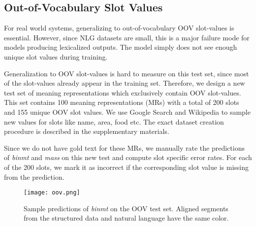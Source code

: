 \documentclass[11pt,a4paper]{article}
\begin{document}
\subsection{Out-of-Vocabulary Slot Values}
For real world systems, generalizing to out-of-vocabulary OOV slot-values is essential. However, since NLG datasets are small, this is a major failure mode for models producing lexicalized outputs. The model simply does not see enough unique slot values during training. \par
Generalization to OOV slot-values is hard to measure on this test set, since most of the slot-values already appear in the training set. Therefore, we design a new test set of meaning representations which exclusively contain OOV slot-values. This set contains 100 meaning representations (MRs) with a total of 200 slots and 155 unique OOV slot values. We use Google Search and Wikipedia to sample new values for slots like name, area, food etc. The exact dataset creation procedure is described in the supplementary materials.  \par Since we do not have gold text for these MRs, we manually rate the predictions of \textsl{binmt} and \textsl{mass} on this new test and compute slot specific error rates. For each of the 200 slots, we mark it as incorrect if the corresponding slot value is missing from the prediction. \par



\begin{figure}[h]
\noindent\texttt{[image: oov.png]}
\caption{
Sample predictions of \textsl{binmt} on the OOV test set. Aligned segments from the structured data and natural language have the same color.
}
\label{fig:oov}
\end{figure}
\end{document}
